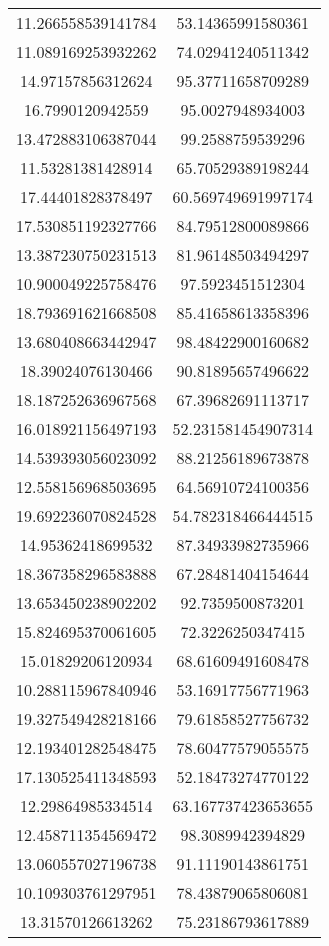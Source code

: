 \begin{table}
\begin{tabular}{cc}
11.266558539141784 & 53.14365991580361 \\
11.089169253932262 & 74.02941240511342 \\
14.97157856312624 & 95.37711658709289 \\
16.7990120942559 & 95.0027948934003 \\
13.472883106387044 & 99.2588759539296 \\
11.53281381428914 & 65.70529389198244 \\
17.44401828378497 & 60.569749691997174 \\
17.530851192327766 & 84.79512800089866 \\
13.387230750231513 & 81.96148503494297 \\
10.900049225758476 & 97.5923451512304 \\
18.793691621668508 & 85.41658613358396 \\
13.680408663442947 & 98.48422900160682 \\
18.39024076130466 & 90.81895657496622 \\
18.187252636967568 & 67.39682691113717 \\
16.018921156497193 & 52.231581454907314 \\
14.539393056023092 & 88.21256189673878 \\
12.558156968503695 & 64.56910724100356 \\
19.692236070824528 & 54.782318466444515 \\
14.95362418699532 & 87.34933982735966 \\
18.367358296583888 & 67.28481404154644 \\
13.653450238902202 & 92.7359500873201 \\
15.824695370061605 & 72.3226250347415 \\
15.01829206120934 & 68.61609491608478 \\
10.288115967840946 & 53.16917756771963 \\
19.327549428218166 & 79.61858527756732 \\
12.193401282548475 & 78.60477579055575 \\
17.130525411348593 & 52.18473274770122 \\
12.29864985334514 & 63.167737423653655 \\
12.458711354569472 & 98.3089942394829 \\
13.060557027196738 & 91.11190143861751 \\
10.109303761297951 & 78.43879065806081 \\
13.31570126613262 & 75.23186793617889 \\

\end{tabular}
\end{table}
